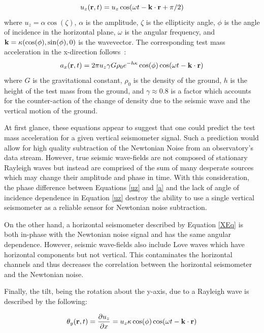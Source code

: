 \documentclass [12pt, proquest]{uwthesis}[2019]
\begin{document}
\begin{equation}
u_z({\bf r} ,t)=u_z \cos(\omega t-{\bf k}\cdot{\bf r}+\pi/2) \label{uz}
\end{equation}
where $u_z=\alpha \cos(\zeta)$, $\alpha$ is the amplitude, $\zeta$ is the ellipticity angle, $\phi$ is the angle of incidence in the horizontal plane, $\omega$ is the angular frequency, and $\bf{k}=\kappa (\cos(\phi),\sin(\phi),\text{0})$ is the wavevector. The corresponding test mass acceleration in the x-direction follows~\cite{Harms_2016}:
\begin{equation}
a_x({\bf r} ,t)=2 \pi u_z \gamma G \rho_0 e^{-h \kappa}  \cos(\phi) \cos(\omega t-{\bf k}\cdot{\bf r}) \label{a}
\end{equation}
where $G$ is the gravitational constant, $\rho_0$ is the density of the ground, $h$ is the height of the test mass from the ground, and $\gamma \approx 0.8$ is a factor which accounts for the counter-action of the change of density due to the seismic wave and the vertical motion of the ground.

At first glance, these equations appear to suggest that one could predict the test mass acceleration for a given vertical seismometer signal. Such a prediction would allow for high quality subtraction of the Newtonian Noise from an observatory's data stream. However, true seismic wave-fields are not composed of stationary Rayleigh waves but instead are comprised of the sum of many desperate sources which may change their amplitude and phase in time. With this consideration, the phase difference between Equations \ref{uz} and \ref{a} and the lack of angle of incidence dependence in Equation \ref{uz} destroy the ability to use a single vertical seismometer as a reliable sensor for Newtonian noise subtraction.

On the other hand, a horizontal seismometer described by Equation \ref{XEq} is both in-phase with the Newtonian noise signal and has the same angular dependence. However, seismic wave-fields also include Love waves which have horizontal components but not vertical. This contaminates the horizontal channels and thus decreases the correlation between the horizontal seismometer and the Newtonian noise. 

Finally, the tilt, being the rotation about the y-axis, due to a Rayleigh wave is described by the following:

\begin{equation}
\theta_y({\bf r} ,t)=\frac{\partial u_z}{\partial x}=u_z \kappa \cos(\phi) \cos(\omega t-{\bf k}\cdot{\bf r})\label{tX}\\
\end{equation}
\end{document}

